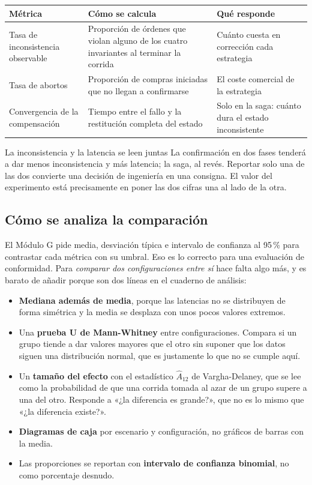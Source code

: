 \documentclass[11pt,a4paper]{article}
\begin{document}
\begin{center}
	\small
	\begin{tabular}{@{}p{4.2cm}p{6.2cm}p{4.6cm}@{}}
		\toprule
		\textbf{Métrica} & \textbf{Cómo se calcula} & \textbf{Qué responde} \\
		\midrule
		Tasa de inconsistencia observable & Proporción de órdenes que violan alguno de los cuatro invariantes al terminar la corrida & Cuánto cuesta en corrección cada estrategia \\
		\addlinespace
		Tasa de abortos & Proporción de compras iniciadas que no llegan a confirmarse & El coste comercial de la estrategia \\
		\addlinespace
		Convergencia de la compensación & Tiempo entre el fallo y la restitución completa del estado & Solo en la saga: cuánto dura el estado inconsistente \\
		\bottomrule
	\end{tabular}
\end{center}

\begin{avisoBox}{La inconsistencia y la latencia se leen juntas}
	La confirmación en dos fases tenderá a dar menos inconsistencia y más latencia; la saga, al revés. Reportar solo una de las dos convierte una decisión de ingeniería en una consigna. El valor del experimento está precisamente en poner las dos cifras una al lado de la otra.
\end{avisoBox}

\subsection{Cómo se analiza la comparación}

El Módulo G pide media, desviación típica e intervalo de confianza al 95\,\% para contrastar cada métrica con su umbral. Eso es lo correcto para una evaluación de conformidad. Para \emph{comparar dos configuraciones entre sí} hace falta algo más, y es barato de añadir porque son dos líneas en el cuaderno de análisis:

\begin{itemize}[leftmargin=*,itemsep=4pt]
	\item \textbf{Mediana además de media}, porque las latencias no se distribuyen de forma simétrica y la media se desplaza con unos pocos valores extremos.
	\item Una \textbf{prueba U de Mann-Whitney} entre configuraciones. Compara si un grupo tiende a dar valores mayores que el otro sin suponer que los datos siguen una distribución normal, que es justamente lo que no se cumple aquí.
	\item Un \textbf{tamaño del efecto} con el estadístico $\hat{A}_{12}$ de Vargha-Delaney, que se lee como la probabilidad de que una corrida tomada al azar de un grupo supere a una del otro. Responde a «¿la diferencia es grande?», que no es lo mismo que «¿la diferencia existe?».
	\item \textbf{Diagramas de caja} por escenario y configuración, no gráficos de barras con la media.
	\item Las proporciones se reportan con \textbf{intervalo de confianza binomial}, no como porcentaje desnudo.
\end{itemize}
\end{document}
